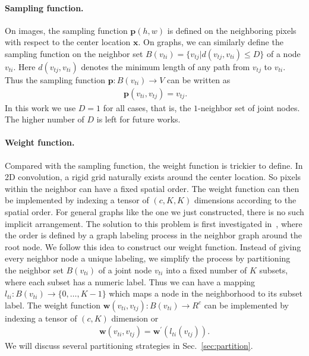 \documentclass[letterpaper]{article} %
\begin{document}
\paragraph{Sampling function.} 
On images, the sampling function $\mathbf{p}(h, w)$ is defined on the neighboring pixels with respect to the center location $ \mathbf{x}$. 
On graphs, we can similarly define the sampling function on the neighbor set $ B(v_{ti})=\{v_{tj} | d(v_{tj}, v_{ti}) \leq D \} $ of a node $ v_{ti} $.
Here $ d(v_{tj}, v_{ti}) $ denotes the minimum length of any path from $v_{tj} $ to $ v_{ti} $. 
Thus the sampling function $ \mathbf{p}:B(v_{ti})\rightarrow V $ can be written as
\begin{align}~\label{eq:sampling}
\mathbf{p}(v_{ti}, v_{tj}) = v_{tj}.
\end{align}
In this work we use $ D = 1 $ for all cases, that is, the $ 1 $-neighbor set of joint nodes.
The higher number of $ D $ is left for future works.

\paragraph{Weight function.}
Compared with the sampling function, the weight function is trickier to define.
In 2D convolution, a rigid grid naturally exists around the center location. 
So pixels within the neighbor can have a fixed spatial order. 
The weight function can then be implemented by indexing a tensor of $ (c, K, K) $ dimensions according to the spatial order.
For general graphs like the one we just constructed, there is no such implicit arrangement.
The solution to this problem is first investigated in~\cite{Niepert2016ICML}, where the order is defined by a graph labeling process in the neighbor graph around the root node.
We follow this idea to construct our weight function.
Instead of giving every neighbor node a unique labeling, we simplify the process by partitioning the neighbor set $B(v_{ti})$ of a joint node $ v_{ti} $ into a fixed number of $ K $ subsets, where each subset has a numeric label.
Thus we can have a mapping $ l_{ti}:B(v_{ti})\rightarrow \{0,\ldots,K-1\} $ which maps a node in the neighborhood to its subset label.
The weight function $ \mathbf{w}(v_{ti}, v_{tj}): B(v_{ti})\rightarrow R^c $ can be implemented by indexing a tensor of $ (c, K) $ dimension or
\begin{align}\label{eq:weight}
\mathbf{w}(v_{ti}, v_{tj}) = \mathbf{w}^\prime(l_{ti}(v_{tj})).
\end{align}
We will discuss several partitioning strategies in Sec.~\ref{sec:partition}.
\end{document}

